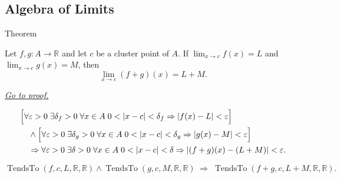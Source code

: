 
\subsection*{Algebra of Limits}
\label{sec:algebra-of-limits-functions}

\begin{theorembox}{Theorem}
\begin{theorem}
\label{thm:limit-sum}
Let $f,g:A\to\mathbb{R}$ and let $c$ be a cluster point of $A$. If
$\lim_{x\to c}f(x)=L$ and $\lim_{x\to c}g(x)=M$, then
\[
  \lim_{x\to c}(f+g)(x)=L+M.
\]

\smallskip\noindent
\hyperref[prf:limit-sum]{\textit{Go to proof.}}
\end{theorem}
\end{theorembox}

\begin{remark*}
\[
\begin{aligned}
&\Bigl[\forall\varepsilon>0\;\exists\delta_f>0\;\forall x\in A\;
  0<|x-c|<\delta_f\Rightarrow |f(x)-L|<\varepsilon\Bigr] \\
&\quad\wedge
\Bigl[\forall\varepsilon>0\;\exists\delta_g>0\;\forall x\in A\;
  0<|x-c|<\delta_g\Rightarrow |g(x)-M|<\varepsilon\Bigr] \\
&\quad\Rightarrow
\forall\varepsilon>0\;\exists\delta>0\;\forall x\in A\;
0<|x-c|<\delta\Rightarrow |(f+g)(x)-(L+M)|<\varepsilon.
\end{aligned}
\]
\end{remark*}

\begin{remark*}
\[
  \operatorname{TendsTo}(f,c,L,\mathbb{R},\mathbb{R})\wedge\operatorname{TendsTo}(g,c,M,\mathbb{R},\mathbb{R})
  \;\Longrightarrow\;
  \operatorname{TendsTo}(f+g,c,L+M,\mathbb{R},\mathbb{R}).
\]
\end{remark*}


